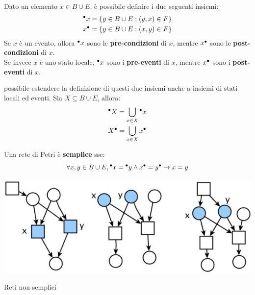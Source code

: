\begin{defn}
    Dato un elemento $x \in B \cup E$, è possibile definire i due seguenti
    insiemi:
    \begin{align*}
        {^\bullet}x &= \left\{y \in B \cup E : (y, x) \in F\right\}\\
        x^\bullet &= \left\{y \in B \cup E : (x, y) \in F\right\}
    \end{align*}
    Se $x$ è un evento, allora ${^\bullet}x$ sono le \textbf{pre-condizioni} di
    $x$, mentre $x^\bullet$ sono le \textbf{post-condizioni} di $x$.\\
    Se invece $x$ è uno stato locale, ${^\bullet}x$ sono i \textbf{pre-eventi}
    di $x$, mentre $x^\bullet$ sono i \textbf{post-eventi} di $x$.

    \upperAccE possibile estendere la definizione di questi due insiemi anche
    a insiemi di stati locali ed eventi. Sia $X \subseteq B \cup E$, allora:
    \begin{align*}
        {^\bullet}X &= \bigcup\limits_{x \in X} {^\bullet}x\\
        X^\bullet &= \bigcup\limits_{x \in X} x^\bullet
    \end{align*}
\end{defn}

\begin{defn}
    Una rete di Petri è \textbf{semplice} sse:
    \[
        \forall x, y \in B \cup E, {^\bullet}x = {^\bullet}y \land
        x^\bullet = y^\bullet \rightarrow x = y
    \]
    \begin{marginfigure}[-5cm]
        \includegraphics[width=1\linewidth]{img/reti_non_semplici.png}
        \caption{Reti non semplici}
        \label{fig:reti_non_semplici}
    \end{marginfigure}
\end{defn}

